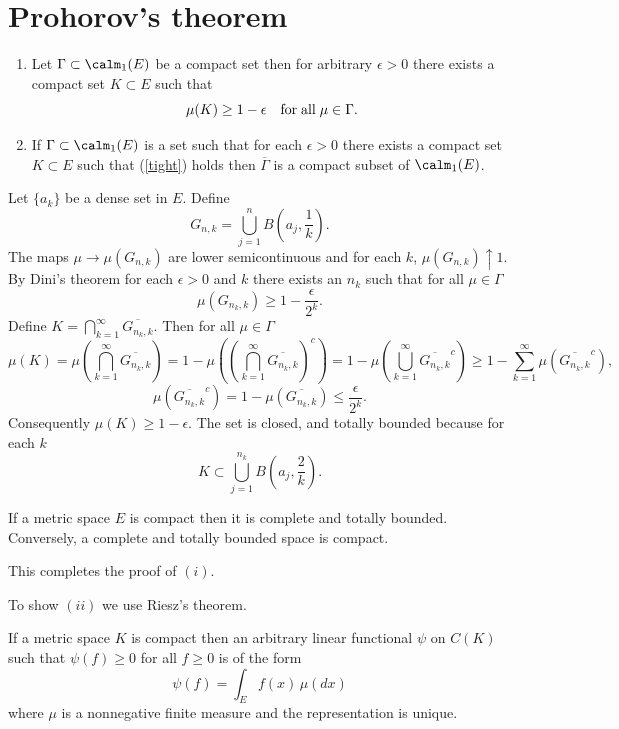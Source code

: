 \documentclass[preprint]{imsart}
\begin{document}
{\section{Prohorov's theorem}

\begin{Theorem}
\begin{enumerate}
  \item[(i)] Let $\Gamma\subset \calm_1(E)$
be a compact set then for arbitrary $\epsilon >0$ there
exists a compact set $K\subset E$ such that
\begin{equation}\label{tight}
\mu(K)\geq 1-\epsilon\quad {\rm for\; all}\; \mu\in\Gamma.
\end{equation}
  \item[(ii)] If $\Gamma\subset \calm_1(E)$ is a
 set such that for each $\epsilon >0$ there exists a
compact set $K\subset E$ such that (\ref{tight}) holds
then $\overline{\Gamma}$ is a compact subset of
$\calm_1(E)$.
\end{enumerate}
\end{Theorem}

Let $\{a_k\}$ be a dense set in $E$. Define
$$
G_{n,k}=\bigcup_{j=1}^nB\left(a_j,\frac{1}{k}\right).
$$
The maps $\mu\to\mu(G_{n,k})$ are lower semicontinuous
and for each $k$, $\mu(G_{n,k})\uparrow 1$. By Dini's
theorem for each $\epsilon >0$ and $k$ there exists an
$n_k$ such that for all $\mu\in\Gamma$
$$
\mu(G_{n_k,k})\geq 1-\frac{\epsilon}{2^k}.
$$
Define $K=\bigcap_{k=1}^\infty\overline{G_{n_k,k}}$.
Then for all $\mu\in\Gamma$
$$
\mu(K)=\mu\left(\bigcap_{k=1}^\infty\overline{G_{n_k,k}}\right)
=1-\mu\left(\left(\bigcap_{k=1}^\infty\overline{G_{n_k,k}}\right)^c
\right)
= 1-
\mu\left(\bigcup_{k=1}^\infty\overline{G_{n_k,k}}^c\right)
\geq 1- \sum_{k=1}^\infty
\mu\left(\overline{G_{n_k,k}}^c\right),
$$
$$
\mu\left(\overline{G_{n_k,k}}^c\right)=
1- \mu\left(\overline{G_{n_k,k}}\right)\leq
\frac{\epsilon}{2^k}.
$$
Consequently $\mu(K)\geq 1-\epsilon$. The set is
closed, and totally bounded because for each $k$
$$
K\subset
\bigcup_{j=1}^{n_k}B\left(a_j,\frac{2}{k}\right).
$$
\begin{Lemma}
If a metric
 space $E$ is compact then it is complete and
totally bounded. Conversely, a complete and totally
bounded space is compact.
\end{Lemma}
This completes the proof of $(i)$.

To show $(ii)$ we use Riesz's theorem.
\begin{Theorem}
If a metric
space $K$ is compact then an arbitrary linear
functional $\psi$ on $C(K)$ such that $\psi(f)\geq 0$
for all $f\geq 0$ is of the form
$$
\psi(f)=\int_Ef(x)\,\mu(dx)
$$
where $\mu$ is a nonnegative finite measure and the
representation is unique.
\end{Theorem}

}
\end{document}
